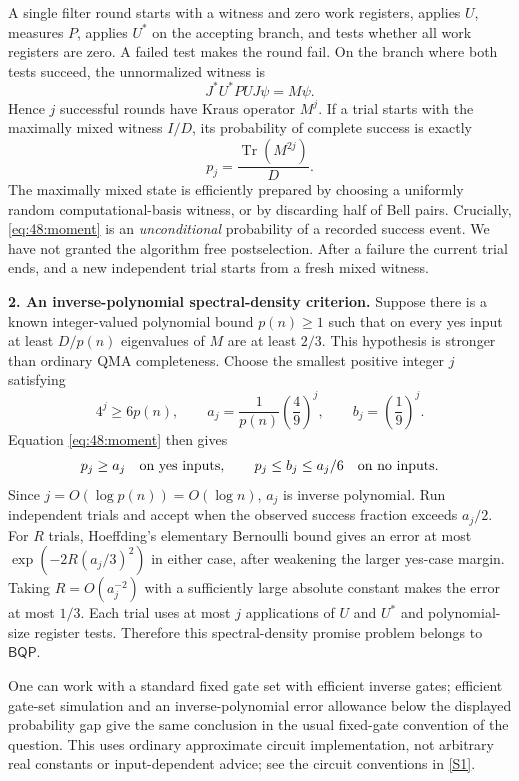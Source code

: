 \documentclass[11pt,a4paper]{article}
\newcommand{\sref}[2]{\hyperlink{source:#1:#2}{[S#2]}}
\numberwithin{equation}{section}
\begin{document}
A single filter round starts with a witness and zero work registers,
applies $U$, measures $P$, applies $U^*$ on the accepting branch, and tests
whether all work registers are zero. A failed test makes the round fail.
On the branch where both tests succeed, the unnormalized witness is
\[
 J^*U^*PUJ\psi=M\psi.
\]
Hence $j$ successful rounds have Kraus operator $M^j$. If a trial starts
with the maximally mixed witness $I/D$, its probability of complete success
is exactly
\begin{equation}\label{eq:48:moment}
 p_j=\frac{\operatorname{Tr}(M^{2j})}{D}.
\end{equation}
The maximally mixed state is efficiently prepared by choosing a uniformly
random computational-basis witness, or by discarding half of Bell pairs.
Crucially, \eqref{eq:48:moment} is an \emph{unconditional} probability of a
recorded success event. We have not granted the algorithm free postselection.
After a failure the current trial ends, and a new independent trial starts
from a fresh mixed witness.

\textbf{2. An inverse-polynomial spectral-density criterion.}
Suppose there is a known integer-valued polynomial bound $p(n)\ge1$ such
that on every yes input at least $D/p(n)$ eigenvalues of $M$ are at least
$2/3$. This hypothesis is stronger than ordinary QMA completeness.
Choose the smallest positive integer $j$ satisfying
\[
 4^j\ge6p(n),\qquad
 a_j=\frac1{p(n)}\left(\frac49\right)^j,\qquad
 b_j=\left(\frac19\right)^j.
\]
Equation \eqref{eq:48:moment} then gives
\[
 p_j\ge a_j\quad\hbox{on yes inputs},\qquad
 p_j\le b_j\le a_j/6\quad\hbox{on no inputs}.
\]
Since $j=O(\log p(n))=O(\log n)$, $a_j$ is inverse polynomial.
Run independent trials and accept when the observed success fraction
exceeds $a_j/2$. For $R$ trials, Hoeffding's elementary Bernoulli bound gives
an error at most $\exp(-2R(a_j/3)^2)$ in either case, after weakening the
larger yes-case margin. Taking $R=O(a_j^{-2})$ with a sufficiently large
absolute constant makes the error at most $1/3$. Each trial uses at most
$j$ applications of $U$ and $U^*$ and polynomial-size register tests.
Therefore this spectral-density promise problem belongs to $\mathsf{BQP}$.

One can work with a standard fixed gate set with efficient inverse gates;
efficient gate-set simulation and an inverse-polynomial error allowance
below the displayed probability gap give the same conclusion in the usual
fixed-gate convention of the question. This uses ordinary approximate
circuit implementation, not arbitrary real constants or input-dependent
advice; see the circuit conventions in \sref{48}{1}.
\end{document}
